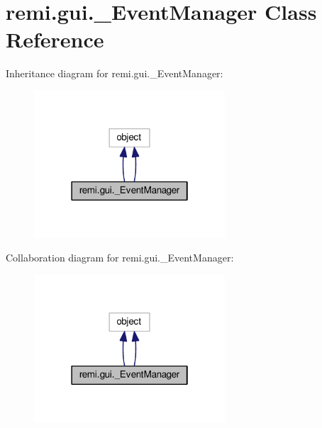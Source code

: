 \hypertarget{classremi_1_1gui_1_1__EventManager}{}\section{remi.\+gui.\+\_\+\+Event\+Manager Class Reference}
\label{classremi_1_1gui_1_1__EventManager}


Inheritance diagram for remi.\+gui.\+\_\+\+Event\+Manager\+:
\nopagebreak
\begin{figure}[H]
\begin{center}
\leavevmode
\includegraphics[width=202pt]{d2/df1/classremi_1_1gui_1_1__EventManager__inherit__graph}
\end{center}
\end{figure}


Collaboration diagram for remi.\+gui.\+\_\+\+Event\+Manager\+:
\nopagebreak
\begin{figure}[H]
\begin{center}
\leavevmode
\includegraphics[width=202pt]{df/d0b/classremi_1_1gui_1_1__EventManager__coll__graph}
\end{center}
\end{figure}
